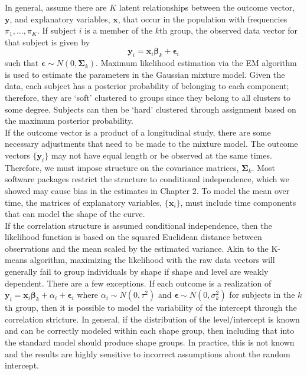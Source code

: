 \documentclass[12pt]{article}
\newcommand{\B}[0]{\mathbf}
\newcommand{\bs}[0]{\boldsymbol}
\begin{document}
In general, assume there are $K$ latent relationships between the outcome vector, $\B y$, and explanatory variables, $\B x$, that occur in the population with frequencies $\pi_{1},...,\pi_{K}$. If subject $i$ is a member of the $k$th group, the observed data vector for that subject is given by
$$\B y_{i} = \B x_{i}\bs\beta_{k}+\bs\epsilon_{i}$$
such that $\bs\epsilon \sim N(0,\bs\Sigma_{k})$. Maximum likelihood estimation via the EM algorithm is used to estimate the parameters in the Gaussian mixture model. Given the data, each subject has a posterior probability of belonging to each component; therefore, they are `soft' clustered to groups since they belong to all clusters to some degree. Subjects can then be `hard' clustered through assignment based on the maximum posterior probability. \\

If the outcome vector is a product of a longitudinal study, there are some necessary adjustments that need to be made to the mixture model. The outcome vectors $\{\B y_{i}\}$ may not have equal length or be observed at the same times. Therefore, we must impose structure on the covariance matrices, $\bs\Sigma_{k}$. Most software packages restrict the structure to conditional independence, which we showed may cause bias in the estimates in Chapter 2. To model the mean over time, the matrices of explanatory variables, $\{\B x_{i}\}$, must include time components that can model the shape of the curve. \\

If the correlation structure is assumed conditional independence, then the likelihood function is based on the squared Euclidean distance between observations and the mean scaled by the estimated variance. Akin to the K-means algorithm, maximizing the likelihood with the raw data vectors will generally fail to group individuals by shape if shape and level are weakly dependent. There are a few exceptions. If each outcome is a realization of $\B y_{i} = \B x_{i}\bs\beta_{k} + \alpha_{i}+\bs\epsilon_{i}$ where $\alpha_{i}\sim N(0,\tau^{2})$ and $\bs\epsilon\sim N(0,\sigma^{2}_{k})$ for subjects in the $k$th group, then it is possible to model the variability of the intercept through the correlation stricture. In general, if the distribution of the level/intercept is known and can be correctly modeled within each shape group, then including that into the standard model should produce shape groups. In practice, this is not known and the results are highly sensitive to incorrect assumptions about the random intercept.\\
\end{document}
